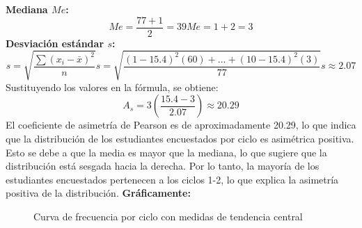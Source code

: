   \textbf{Mediana \(Me\):}
  \begin{equation*}
    Me = \dfrac{77 + 1}{2} = 39
    Me = 1+2 = 3
  \end{equation*}
  \textbf{Desviación estándar \(s\):}
  \begin{equation*}
    s = \sqrt{\dfrac{\sum (x_i - \bar{x})^2}{n}}
    s = \sqrt{\dfrac{(1-15.4)^2(60) + ... + (10-15.4)^2(3)}{77}}
    s \approx 2.07
  \end{equation*}
Sustituyendo los valores en la fórmula, se obtiene:
\begin{equation*}
  A_s = 3 \left( \dfrac{15.4 - 3}{2.07} \right) \approx 20.29
\end{equation*}
El coeficiente de asimetría de Pearson es de aproximadamente 20.29, lo que indica que la distribución de los estudiantes encuestados por ciclo es asimétrica positiva. Esto se debe a que la media es mayor que la mediana, lo que sugiere que la distribución está sesgada hacia la derecha. Por lo tanto, la mayoría de los estudiantes encuestados pertenecen a los ciclos 1-2, lo que explica la asimetría positiva de la distribución.
\textbf{Gráficamente:}
\begin{figure}[H]
	\centering
	\hspace*{-1.5cm}
	\caption{Curva de frecuencia por ciclo con medidas de tendencia central}
\end{figure}
